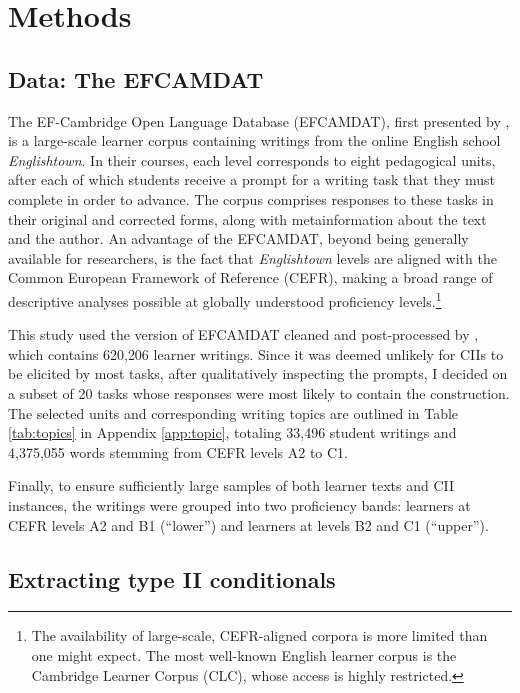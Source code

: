 \section{Methods}


\subsection{Data: The EFCAMDAT}
\label{data}

 The EF-Cambridge Open Language Database (EFCAMDAT), first presented by \citet{geertzen2013automatic}, is a large-scale learner corpus containing writings from the online English school \textit{Englishtown}.
 In their courses, each level corresponds to eight pedagogical units, after each of which students receive a prompt for a writing task that they must complete in order to advance. 
 The corpus comprises responses to these tasks in their original and corrected forms, along with metainformation about the text and the author.
 An advantage of the EFCAMDAT, beyond being generally available for researchers, is the fact that \textit{Englishtown} levels are aligned with the Common European Framework of Reference (CEFR), making a broad range of descriptive analyses possible at globally understood proficiency levels.\footnote{The availability of large-scale, CEFR-aligned corpora is more limited than one might expect. The most well-known English learner corpus is the Cambridge Learner Corpus (CLC), whose access is highly restricted.}

This study used the version of EFCAMDAT cleaned and post-processed by \cite{oksus_alexopoulou_derkach_tsimpli_2025}, which contains 620{,}206 learner writings.
Since it was deemed unlikely for CIIs to be elicited by most tasks, after qualitatively inspecting the prompts, I decided on a subset of 20 tasks whose responses were most likely to contain the construction. 
The selected units and corresponding writing topics are outlined in Table \ref{tab:topics} in Appendix \ref{app:topic}, totaling 33{,}496 student writings and 4{,}375{,}055 words stemming from CEFR levels A2 to C1.

Finally, to ensure sufficiently large samples of both learner texts and CII instances, the writings were grouped into two proficiency bands: 
learners at CEFR levels A2 and B1 (“lower”) and learners at levels B2 and C1 (“upper”).


\subsection{Extracting type II conditionals}

